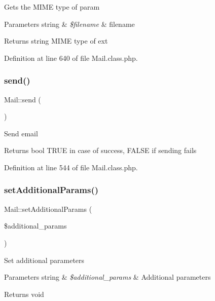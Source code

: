 Gets the M\+I\+ME type of param


\begin{DoxyParams}[1]{Parameters}
string & {\em \$filename} & filename \\
\hline
\end{DoxyParams}
\begin{DoxyReturn}{Returns}
string M\+I\+ME type of ext 
\end{DoxyReturn}


Definition at line 640 of file Mail.\+class.\+php.

\hypertarget{classMail_a6520941b529c223c1b59ec7544f7f7d6}{}\label{classMail_a6520941b529c223c1b59ec7544f7f7d6} 
\subsubsection{\texorpdfstring{send()}{send()}}
{\footnotesize\ttfamily Mail\+::send (\begin{DoxyParamCaption}{ }\end{DoxyParamCaption})}

Send email

\begin{DoxyReturn}{Returns}
bool T\+R\+UE in case of success, F\+A\+L\+SE if sending fails 
\end{DoxyReturn}


Definition at line 544 of file Mail.\+class.\+php.

\hypertarget{classMail_abea35dd9f29bbebacfc79ec2c7852799}{}\label{classMail_abea35dd9f29bbebacfc79ec2c7852799} 
\subsubsection{\texorpdfstring{set\+Additional\+Params()}{setAdditionalParams()}}
{\footnotesize\ttfamily Mail\+::set\+Additional\+Params (\begin{DoxyParamCaption}\item[{}]{\$additional\+\_\+params }\end{DoxyParamCaption})}

Set additional parameters


\begin{DoxyParams}[1]{Parameters}
string & {\em \$additional\+\_\+params} & Additional parameters \\
\hline
\end{DoxyParams}
\begin{DoxyReturn}{Returns}
void 
\end{DoxyReturn}


